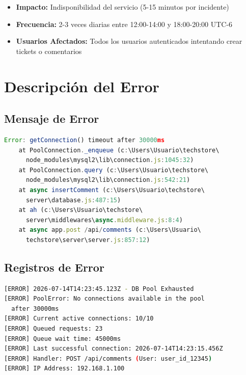 \documentclass[12pt,a4paper]{article}
\begin{document}
\begin{itemize}
    \item \textbf{Impacto:} Indisponibilidad del servicio (5-15 minutos por incidente)
    \item \textbf{Frecuencia:} 2-3 veces diarias entre 12:00-14:00 y 18:00-20:00 UTC-6
    \item \textbf{Usuarios Afectados:} Todos los usuarios autenticados intentando crear tickets o comentarios
\end{itemize}

\newpage

\section{Descripción del Error}

\subsection{Mensaje de Error}

\begin{lstlisting}[language=JavaScript, caption=Stack trace del error]
Error: getConnection() timeout after 30000ms
    at PoolConnection._enqueue (c:\Users\Usuario\techstore\
      node_modules\mysql2\lib\connection.js:1045:32)
    at PoolConnection.query (c:\Users\Usuario\techstore\
      node_modules\mysql2\lib\connection.js:542:21)
    at async insertComment (c:\Users\Usuario\techstore\
      server\database.js:487:15)
    at ah (c:\Users\Usuario\techstore\
      server\middlewares\async.middleware.js:8:4)
    at async app.post /api/comments (c:\Users\Usuario\
      techstore\server\server.js:857:12)
\end{lstlisting}

\subsection{Registros de Error}

\begin{lstlisting}[language=bash, caption=Error logs del servidor]
[ERROR] 2026-07-14T14:23:45.123Z - DB Pool Exhausted
[ERROR] PoolError: No connections available in the pool 
  after 30000ms
[ERROR] Current active connections: 10/10
[ERROR] Queued requests: 23
[ERROR] Queue wait time: 45000ms
[ERROR] Last successful connection: 2026-07-14T14:23:15.456Z
[ERROR] Handler: POST /api/comments (User: user_id_12345)
[ERROR] IP Address: 192.168.1.100
\end{lstlisting}
\end{document}
